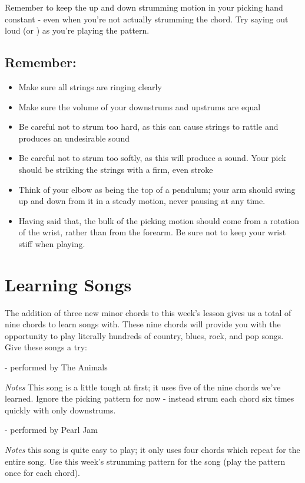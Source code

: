 Remember to keep the up and down strumming motion in your picking hand constant
- even when you're not actually strumming the chord. Try saying out loud  (or ) as you're playing the pattern.

\subsection{Remember:}
\begin{itemize}
\item Make sure all strings are ringing clearly
\item Make sure the volume of your downstrums and upstrums are equal
\item Be careful not to strum too hard, as this can cause strings to rattle and
      produces an undesirable sound
\item Be careful not to strum too softly, as this will produce a  sound.
      Your pick should be striking the strings with a firm, even stroke
\item Think of your elbow as being the top of a pendulum; your arm should swing
      up and down from it in a steady motion, never pausing at any time.
\item Having said that, the bulk of the picking motion should come from a
      rotation of the wrist, rather than from the forearm. Be sure not to keep your
      wrist stiff when playing.
\end{itemize}

\section{Learning Songs}
The addition of three new minor chords to this week's lesson gives us a total
of nine chords to learn songs with. These nine chords will provide you with the
opportunity to play literally hundreds of country, blues, rock, and pop songs.
Give these songs a try:

 - performed by The Animals

\emph{Notes} This song is a little tough at first; it uses five of the nine
chords we've learned. Ignore the picking pattern for now - instead strum each
chord six times quickly with only downstrums.

 - performed by Pearl Jam

\emph{Notes} this song is quite easy to play; it only uses four chords
which repeat for the entire song. Use this week's strumming pattern for the
song (play the pattern once for each chord).


